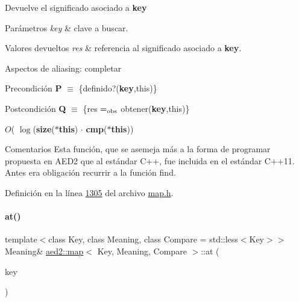 Devuelve el significado asociado a {\bfseries key} 


\begin{DoxyParams}{Parámetros}
{\em key} & clave a buscar. \\
\hline
\end{DoxyParams}

\begin{DoxyRetVals}{Valores devueltos}
{\em res} & referencia al significado asociado a {\bfseries key}.\\
\hline
\end{DoxyRetVals}
\begin{DoxyParagraph}{Aspectos de aliasing\+:}
completar
\end{DoxyParagraph}
\begin{DoxyPrecond}{Precondición}
{\bfseries P} $\equiv$ \{definido?({\bfseries key},this)\}
\end{DoxyPrecond}
\begin{DoxyPostcond}{Postcondición}
{\bfseries Q} $\equiv$ \{res $=_{\rm obs}$ obtener({\bfseries key},this)\}
\end{DoxyPostcond}

\begin{DoxyDescription}
\item[Complejidad Temporal]$O$( $\log$({\bfseries size}({\bfseries $\ast$this}) $\cdot$ {\bfseries cmp}({\bfseries $\ast$this}))
\end{DoxyDescription}

\begin{DoxyRemark}{Comentarios}
Esta función, que se asemeja más a la forma de programar propuesta en A\+E\+D2 que al estándar C++, fue incluida en el estándar C++11. Antes era obligación recurrir a la función find. 
\end{DoxyRemark}


Definición en la línea \hyperlink{map_8h_source_l01305}{1305} del archivo \hyperlink{map_8h_source}{map.\+h}.

\mbox{\label{classaed2_1_1map_a6b21c09f59a83b6ee45432dcfa61f4a1_a6b21c09f59a83b6ee45432dcfa61f4a1}} 
\paragraph{\texorpdfstring{at()}{at()}\hspace{0.1cm}{\footnotesize\ttfamily [2/2]}}
{\footnotesize\ttfamily template$<$class Key, class Meaning, class Compare = std\+::less$<$\+Key$>$$>$ \\
Meaning\& \hyperlink{classaed2_1_1map}{aed2\+::map}$<$ Key, Meaning, Compare $>$\+::at (\begin{DoxyParamCaption}\item[{const Key \&}]{key }\end{DoxyParamCaption})\hspace{0.3cm}{\ttfamily [inline]}}

